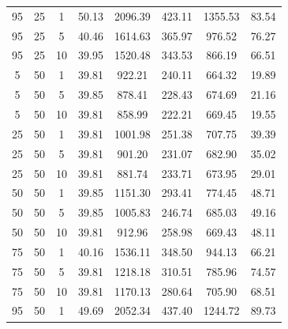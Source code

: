 \begin{table}[H]
\begin{tabular}{ccc|c|c|c|c|c}
95 & 25 & 1 & \cellcolor{gray!1}50.13 & \cellcolor{gray!1}2096.39 & \cellcolor{gray!1}423.11 & \cellcolor{gray!1}1355.53 & 83.54\\
95 & 25 & 5 & \cellcolor{gray!74}40.46 & \cellcolor{gray!1}1614.63 & \cellcolor{gray!1}365.97 & \cellcolor{gray!1}976.52 & 76.27\\
95 & 25 & 10 & \cellcolor{gray!79}39.95 & \cellcolor{gray!1}1520.48 & \cellcolor{gray!1}343.53 & \cellcolor{gray!17}866.19 & 66.51\\
5 & 50 & 1 & \cellcolor{gray!80}39.81 & \cellcolor{gray!48}922.21 & \cellcolor{gray!21}240.11 & \cellcolor{gray!79}664.32 & 19.89\\
5 & 50 & 5 & \cellcolor{gray!80}39.85 & \cellcolor{gray!55}878.41 & \cellcolor{gray!32}228.43 & \cellcolor{gray!76}674.69 & 21.16\\
5 & 50 & 10 & \cellcolor{gray!80}39.81 & \cellcolor{gray!58}858.99 & \cellcolor{gray!38}222.21 & \cellcolor{gray!78}669.45 & 19.55\\
25 & 50 & 1 & \cellcolor{gray!80}39.81 & \cellcolor{gray!34}1001.98 & \cellcolor{gray!11}251.38 & \cellcolor{gray!66}707.75 & 39.39\\
25 & 50 & 5 & \cellcolor{gray!80}39.81 & \cellcolor{gray!51}901.20 & \cellcolor{gray!30}231.07 & \cellcolor{gray!73}682.90 & 35.02\\
25 & 50 & 10 & \cellcolor{gray!80}39.81 & \cellcolor{gray!54}881.74 & \cellcolor{gray!27}233.71 & \cellcolor{gray!76}673.95 & 29.01\\
50 & 50 & 1 & \cellcolor{gray!80}39.85 & \cellcolor{gray!9}1151.30 & \cellcolor{gray!1}293.41 & \cellcolor{gray!45}774.45 & 48.71\\
50 & 50 & 5 & \cellcolor{gray!80}39.85 & \cellcolor{gray!34}1005.83 & \cellcolor{gray!15}246.74 & \cellcolor{gray!73}685.03 & 49.16\\
50 & 50 & 10 & \cellcolor{gray!80}39.81 & \cellcolor{gray!49}912.96 & \cellcolor{gray!4}258.98 & \cellcolor{gray!78}669.43 & 48.11\\
75 & 50 & 1 & \cellcolor{gray!77}40.16 & \cellcolor{gray!1}1536.11 & \cellcolor{gray!1}348.50 & \cellcolor{gray!1}944.13 & 66.21\\
75 & 50 & 5 & \cellcolor{gray!80}39.81 & \cellcolor{gray!1}1218.18 & \cellcolor{gray!1}310.51 & \cellcolor{gray!42}785.96 & 74.57\\
75 & 50 & 10 & \cellcolor{gray!80}39.81 & \cellcolor{gray!6}1170.13 & \cellcolor{gray!1}280.64 & \cellcolor{gray!66}705.90 & 68.51\\
95 & 50 & 1 & \cellcolor{gray!1}49.69 & \cellcolor{gray!1}2052.34 & \cellcolor{gray!1}437.40 & \cellcolor{gray!1}1244.72 & 89.73\\

\end{tabular}
\end{table}
